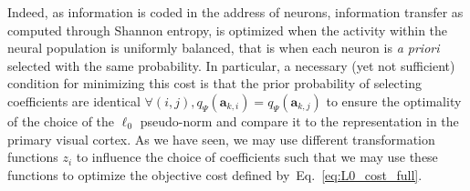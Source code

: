\documentclass[letterpaper,final,conference,10pt]{IEEEtran}
\newcommand{\coef}{\mathbf{a}} %
\newcommand{\image}{\mathbf{y}} %
\newcommand{\dico}{\Phi} %
\newcommand{\seeEq}[1]{Eq.~\ref{eq:#1}}%
\begin{document}
Indeed, as information is coded in the address of neurons, information transfer as computed through Shannon entropy, is optimized when the activity within the neural population is uniformly balanced, that is when each neuron is \emph{a priori} selected with the same probability. In particular, a necessary (yet not sufficient) condition for minimizing this cost is that the prior probability of selecting coefficients are identical $\forall (i,j), q_\Psi(\coef_{k,i})=q_\Psi(\coef_{k,j})$ to ensure the optimality of the choice of the $\ell_0$ pseudo-norm and compare it to the representation in the primary visual cortex. As we have seen, we may use different transformation functions $z_i$ to influence the choice of coefficients such that we may use these functions to optimize the objective cost defined by~\seeEq{L0_cost_full}. 
\end{document}
